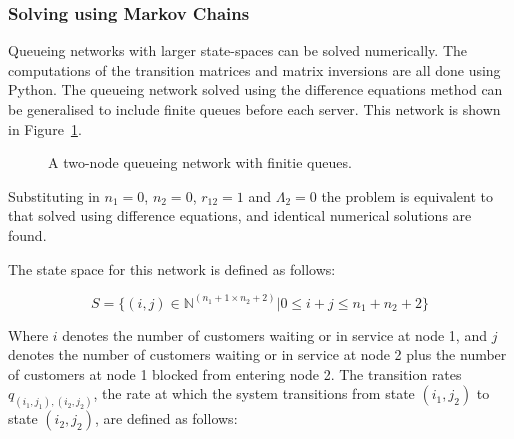 \documentclass{article}
\begin{document}
\subsubsection{Solving using Markov Chains}

Queueing networks with larger state-spaces can be solved numerically.
The computations of the transition matrices and matrix inversions are all done using Python.
The queueing network solved using the difference equations method can be generalised to include finite queues before each server.
This network is shown in Figure~\ref{fig:2nodesQs}.

\begin{figure}[H]
    
    \caption{A two-node queueing network with finitie queues.}
    \label{fig:2nodesQs}
\end{figure}

Substituting in $n_1 = 0$, $n_2 = 0$, $r_{12} = 1$ and $\Lambda_2 = 0$ the problem is equivalent to that solved using difference equations, and identical numerical solutions are found.

The state space for this network is defined as follows:

\begin{equation*}
    S = \{(i,j)\in\mathbb{N}^{(n_1+1\times n_2+2)}| 0 \leq i + j \leq n_1 + n_2 + 2\}
\end{equation*}

Where $i$ denotes the number of customers waiting or in service at node 1, and $j$ denotes the number of customers waiting or in service at node 2 plus the number of customers at node 1 blocked from entering node 2.
The transition rates $q_{(i_1, j_1),(i_2, j_2)}$, the rate at which the system transitions from state $(i_1, j_2)$ to state $(i_2, j_2)$, are defined as follows:
\end{document}
